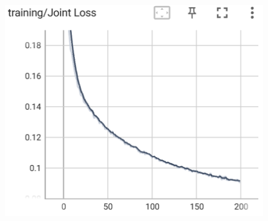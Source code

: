 \documentclass[12pt]{article}
\begin{document}
\begin{enumerate}
\begin{figure}[htbp]
\begin{minipage}{0.4\linewidth}
		\label{pic two}%
	\end{minipage}
	\begin{minipage}{0.4\linewidth}
		\centering
		\includegraphics[width=0.9\linewidth]{./figs/joint_loss_99_1.png}
		\label{pic three}%
	\end{minipage}
    \end{figure}


\end{enumerate}
\end{document}
